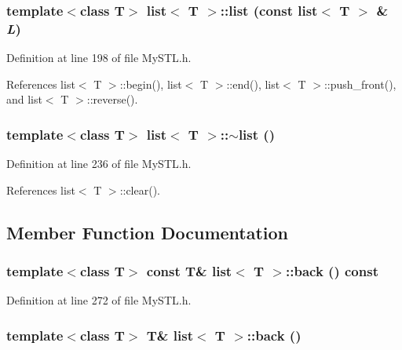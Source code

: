 \subsubsection[{list}]{\setlength{\rightskip}{0pt plus 5cm}template$<$class T$>$ {\bf list}$<$ T $>$::{\bf list} (const {\bf list}$<$ T $>$ \& {\em L})}\label{classlist_a856a032c093d96abca1ea4e96e64f05a}


Definition at line 198 of file MySTL.h.



References list$<$ T $>$::begin(), list$<$ T $>$::end(), list$<$ T $>$::push\_\-front(), and list$<$ T $>$::reverse().

\subsubsection[{$\sim$list}]{\setlength{\rightskip}{0pt plus 5cm}template$<$class T$>$ {\bf list}$<$ T $>$::$\sim${\bf list} ()}\label{classlist_adf352cf28624c0811f4f9b160062a88c}


Definition at line 236 of file MySTL.h.



References list$<$ T $>$::clear().



\subsection{Member Function Documentation}
\subsubsection[{back}]{\setlength{\rightskip}{0pt plus 5cm}template$<$class T$>$ const T\& {\bf list}$<$ T $>$::back () const}\label{classlist_adee5737f4d792778a0f90ae2a286cf7b}


Definition at line 272 of file MySTL.h.

\subsubsection[{back}]{\setlength{\rightskip}{0pt plus 5cm}template$<$class T$>$ T\& {\bf list}$<$ T $>$::back ()}\label{classlist_a724be25db9c9111f09dde385cabf2e91}


